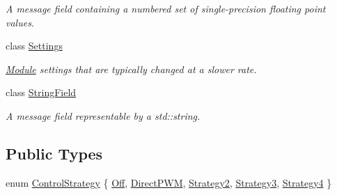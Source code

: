 \begin{DoxyCompactItemize}
\begin{DoxyCompactList}\small\item\em A message field containing a numbered set of single-\/precision floating point values. \end{DoxyCompactList}\item 
class \hyperlink{classhebi_1_1Command_1_1Settings}{Settings}
\begin{DoxyCompactList}\small\item\em \hyperlink{classhebi_1_1Module}{Module} settings that are typically changed at a slower rate. \end{DoxyCompactList}\item 
class \hyperlink{classhebi_1_1Command_1_1StringField}{String\+Field}
\begin{DoxyCompactList}\small\item\em A message field representable by a std\+::string. \end{DoxyCompactList}\end{DoxyCompactItemize}
\subsection*{Public Types}
\begin{DoxyCompactItemize}
\item 
enum \hyperlink{classhebi_1_1Command_a0f4b41003c36dee21578caddb605c64a}{Control\+Strategy} \{ \newline
\hyperlink{classhebi_1_1Command_a0f4b41003c36dee21578caddb605c64aafe98afde491faf74d257f008c2f68ee9}{Off}, 
\hyperlink{classhebi_1_1Command_a0f4b41003c36dee21578caddb605c64aa4caa7bdaeb957f4d606344937eca082f}{Direct\+P\+WM}, 
\hyperlink{classhebi_1_1Command_a0f4b41003c36dee21578caddb605c64aa46262e3b8b0440dcad719de382c8adda}{Strategy2}, 
\hyperlink{classhebi_1_1Command_a0f4b41003c36dee21578caddb605c64aab04b6dd90ed193382865ff31530508dd}{Strategy3}, 
\newline
\hyperlink{classhebi_1_1Command_a0f4b41003c36dee21578caddb605c64aab95ab30225f22ad6da4d52868a85d8c1}{Strategy4}
 \}
\end{DoxyCompactItemize}
